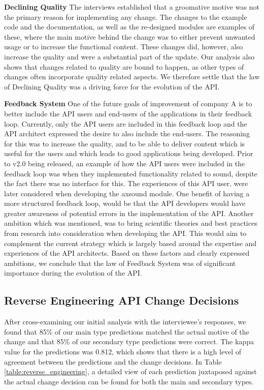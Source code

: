 \documentclass{sig-alternate}
\begin{document}
\smallskip \noindent
\textbf{Declining Quality  } 
The interviews established that a groomative motive was not the primary reason for implementing any change. The changes to the example code and the documentation, as well as the re-designed modules are examples of these, where the main motive behind the change was to either prevent unwanted usage or to increase the functional content. These changes did, however, also increase the quality and were a substantial part of the update. Our analysis also shows that changes related to quality are bound to happen, as other types of changes often incorporate quality related aspects. We therefore settle that the law of Declining Quality was a driving force for the evolution of the API. 

\newpage

\smallskip \noindent
\textbf{Feedback System  } 
One of the future goals of improvement of company A is to better include the API users and end-users of the applications in their feedback loop. Currently, only the API users are included in this feedback loop and the API architect expressed the desire to also include the end-users. The reasoning for this was to increase the quality, and to be able to deliver content which is useful for the users and which leads to good applications being developed. Prior to v2.0 being released, an example of how the API users were included in the feedback loop was when they implemented functionality related to sound, despite the fact there was no interface for this.  The experiences of this API user, were later considered when developing the axsound module. One benefit of having a more structured feedback loop, would be that the API developers would have greater awareness of potential errors in the implementation of the API. Another ambition which was mentioned, was to bring scientific theories and best practices from research into consideration when developing the API. This would aim to complement the current strategy which is largely based around the expertise and experiences of the API architects. Based on these factors and clearly expressed ambitions, we conclude that the law of Feedback System was of significant importance during the evolution of the API. 



\subsection{Reverse Engineering API Change Decisions}
After cross-examining our initial analysis with the interviewee's responses, we found that 85\% of our main type predictions matched the actual motive of the change and that 85\% of our secondary type predictions were correct. The kappa value \cite{cohen1968weighted} for the predictions was 0.812, which shows that there is a high level of agreement between the predictions and the change decisions. In Table \ref{table:reverse_engineering}, a detailed view of each prediction juxtaposed against the actual change decision can be found for both the main and secondary types.  
\end{document}
